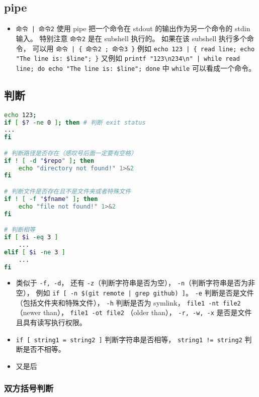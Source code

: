 \subsection{pipe}
\begin{itemize}
\item \verb`命令 | 命令2` 使用 pipe 把一个命令在 stdout 的输出作为另一个命令的 stdin 输入。 特别注意 \verb`命令2` 是在 subshell 执行的。 如果在该 subshell 执行多个命令， 可以用 \verb`命令 | { 命令2 ; 命令3 }` 例如 \verb`echo 123 | { read line; echo "The line is: $line"; }` 又例如 \verb`printf "123\n234\n" | while read line; do echo "The line is: $line"; done` 中 \verb`while` 可以看成一个命令。
\end{itemize}


\subsection{判断}
\begin{lstlisting}[language=bash]
echo 123;
if [ $? -ne 0 ]; then # 判断 exit status
...
fi

# 判断路径是否存在（感叹号后面一定要有空格）
if ! [ -d "$repo" ]; then
    echo "directory not found!" 1>&2
fi

# 判断文件是否存在且不是文件夹或者特殊文件
if ! [ -f "$fname" ]; then
    echo "file not found!" 1>&2
fi

# 判断相等
if [ $i -eq 3 ]
    ...
elif [ $i -ne 3 ]
    ...
fi
\end{lstlisting}
\begin{itemize}
\item 类似于 \verb`-f, -d`， 还有 \verb`-z`（判断字符串是否为空）， \verb`-n`（判断字符串是否为非空）， 例如 \verb`if [ -n $(git remote | grep github) ]`。  \verb`-e` 判断是否是文件（包括文件夹和特殊文件）， \verb`-h` 判断是否为 symlink， \verb`file1 -nt file2` （newer than）， \verb`file1 -ot file2` （older than）， \verb`-r, -w, -x` 是否是文件且具有读写执行权限。
\item \verb`if [ string1 = string2 ]` 判断字符串是否相等， \verb`string1 != string2` 判断是否不相等。
\item 又是后
\end{itemize}

\subsubsection{双方括号判断}

